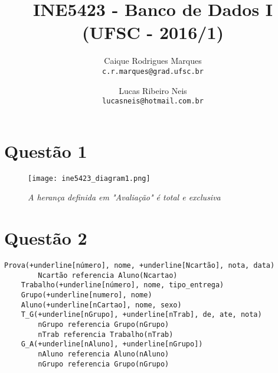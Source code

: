 \documentclass{article}
\title{\textbf{INE5423 - Banco de Dados I (UFSC - 2016/1)}}
\author{
    Caique Rodrigues Marques \\
    {\texttt{c.r.marques@grad.ufsc.br}}
    \and
    Lucas Ribeiro Neis \\
    {\texttt{lucasneis@hotmail.com.br}}
    \vspace{-5mm}
}
\date{}
\begin{document}
\maketitle

\section*{Questão 1}
    \begin{figure*}[h!]
        \centering
        \texttt{[image: ine5423\_diagram1.png]}
        \caption*{\textit{A herança definida em "Avaliação" é total e exclusiva}}
    \end{figure*}
    
\section*{Questão 2}
    \begin{Verbatim}[commandchars=+\[\]]
    Prova(+underline[número], nome, +underline[Ncartão], nota, data)
        Ncartão referencia Aluno(Ncartao)
    Trabalho(+underline[número], nome, tipo_entrega)
    Grupo(+underline[numero], nome)
    Aluno(+underline[nCartao], nome, sexo)
    T_G(+underline[nGrupo], +underline[nTrab], de, ate, nota)
        nGrupo referencia Grupo(nGrupo)
        nTrab referencia Trabalho(nTrab)
    G_A(+underline[nAluno], +underline[nGrupo])
        nAluno referencia Aluno(nAluno)
        nGrupo referencia Grupo(nGrupo)
    \end{Verbatim}
\end{document}
